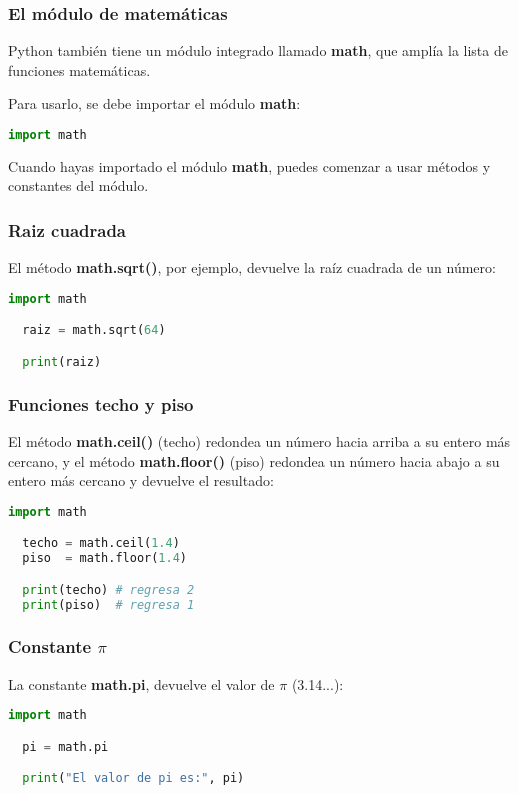 \begin{frame}[fragile]
  \frametitle{El módulo de matemáticas}

  Python también tiene un módulo integrado llamado \textbf{math},
  que amplía la lista de funciones matemáticas.

  \vspace{\baselineskip}
  Para usarlo, se debe importar el módulo \textbf{math}:

  \vspace{\baselineskip}
  \begin{lstlisting}[language=Python]
  import math
  \end{lstlisting}

  \vspace{\baselineskip}
  Cuando hayas importado el módulo \textbf{math}, puedes comenzar
  a usar métodos y constantes del módulo.
\end{frame}

\begin{frame}[fragile]
  \frametitle{Raiz cuadrada}

  El método \textbf{math.sqrt()}, por ejemplo, devuelve la raíz
  cuadrada de un número:

  \begin{lstlisting}[language=Python]
  import math

  raiz = math.sqrt(64)

  print(raiz)
  \end{lstlisting}
\end{frame}

\begin{frame}[fragile]
  \frametitle{Funciones techo y piso}

  El método \textbf{math.ceil()} (techo) redondea un número hacia arriba a
  su entero más cercano, y el método \textbf{math.floor()} (piso) redondea
  un número hacia abajo a su entero más cercano y devuelve el resultado:

  \begin{lstlisting}[language=Python]
  import math

  techo = math.ceil(1.4)
  piso  = math.floor(1.4)

  print(techo) # regresa 2
  print(piso)  # regresa 1
  \end{lstlisting}
\end{frame}

\begin{frame}[fragile]
  \frametitle{Constante $\pi$}

  La constante \textbf{math.pi}, devuelve el valor de $\pi$ (3.14...):

  \begin{lstlisting}[language=Python]
  import math

  pi = math.pi

  print("El valor de pi es:", pi)
  \end{lstlisting}
\end{frame}
